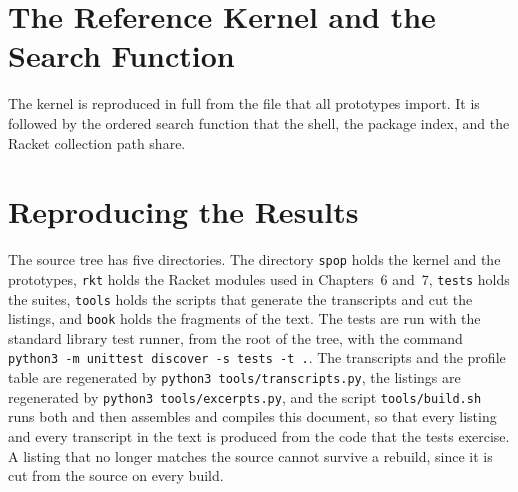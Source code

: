 \appendix

\chapter{The Reference Kernel and the Search Function}

The kernel is reproduced in full from the file that all prototypes import. It is followed by the ordered search function that the shell, the package index, and the Racket collection path share.





\chapter{Reproducing the Results}

The source tree has five directories. The directory \texttt{spop} holds the kernel and the prototypes, \texttt{rkt} holds the Racket modules used in Chapters~6 and~7, \texttt{tests} holds the suites, \texttt{tools} holds the scripts that generate the transcripts and cut the listings, and \texttt{book} holds the fragments of the text. The tests are run with the standard library test runner, from the root of the tree, with the command \texttt{python3 -m unittest discover -s tests -t .}. The transcripts and the profile table are regenerated by \texttt{python3 tools/transcripts.py}, the listings are regenerated by \texttt{python3 tools/excerpts.py}, and the script \texttt{tools/build.sh} runs both and then assembles and compiles this document, so that every listing and every transcript in the text is produced from the code that the tests exercise. A listing that no longer matches the source cannot survive a rebuild, since it is cut from the source on every build.

